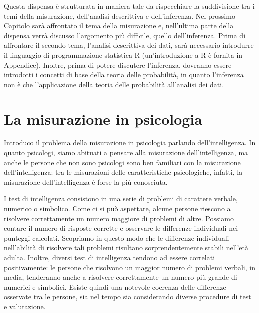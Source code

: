 \documentclass[
  11pt,
]{krantz}
\theoremstyle{definition}
\theoremstyle{definition}
\theoremstyle{definition}
\theoremstyle{definition}
\theoremstyle{remark}
\begin{document}
Questa dispensa è strutturata in maniera tale da rispecchiare la suddivisione tra i temi della misurazione, dell'analisi descrittiva e dell'inferenza. Nel prossimo Capitolo sarà affrontato il tema della misurazione e, nell'ultima parte della dispensa verrà discusso l'argomento più difficile, quello dell'inferenza. Prima di affrontare il secondo tema, l'analisi descrittiva dei dati, sarà necessario introdurre il linguaggio di programmazione statistica R (un'introduzione a R è fornita in Appendice). Inoltre, prima di potere discutere l'inferenza, dovranno essere introdotti i concetti di base della teoria delle probabilità, in quanto l'inferenza non è che l'applicazione della teoria delle probabilità all'analisi dei dati.

\hypertarget{chapter-misurazione}{%
\chapter{La misurazione in psicologia}\label{chapter-misurazione}}

Introduco il problema della misurazione in psicologia parlando dell'intelligenza. In quanto psicologi, siamo abituati a pensare alla misurazione dell'intelligenza, ma anche le persone che non sono psicologi sono ben familiari con la misurazione dell'intelligenza: tra le misurazioni delle caratteristiche psicologiche, infatti, la misurazione dell'intelligenza è forse la più conosciuta.

I test di intelligenza consistono in una serie di problemi di carattere verbale, numerico o simbolico. Come ci si può aspettare, alcune persone riescono a risolvere correttamente un numero maggiore di problemi di altre. Possiamo contare il numero di risposte corrette e osservare le differenze individuali nei punteggi calcolati. Scopriamo in questo modo che le differenze individuali nell'abilità di risolvere tali problemi risultano sorprendentemente stabili nell'età adulta. Inoltre, diversi test di intelligenza tendono ad essere correlati positivamente: le persone che risolvono un maggior numero di problemi verbali, in media, tenderanno anche a risolvere correttamente un numero più grande di numerici e simbolici. Esiste quindi una notevole coerenza delle differenze osservate tra le persone, sia nel tempo sia considerando diverse procedure di test e valutazione.
\end{document}
